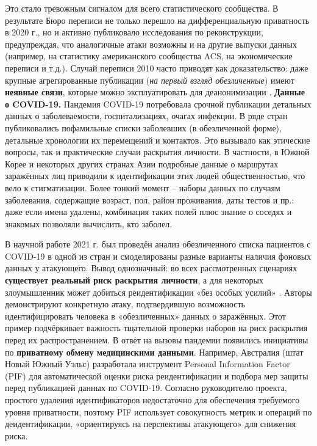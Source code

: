 Это стало тревожным сигналом для
всего статистического сообщества. В результате Бюро переписи не только перешло на дифференциальную приватность в 2020
г., но и активно публиковало исследования по реконструкции, предупреждая, что аналогичные атаки возможны и на другие
выпуски данных (например, на статистику американского сообщества ACS, на экономические переписи и т.д.). Случай переписи
2010 часто приводят как доказательство: даже крупные агрегированные публикации (\textit{на первый взгляд обезличенные})
имеют \textbf{неявные связи}, которые можно эксплуатировать для деанонимизации \autocite{cornell-edu}. \textbf{Данные о
COVID-19.} Пандемия COVID-19 потребовала срочной публикации детальных данных о заболеваемости, госпитализациях, очагах
инфекции. В ряде стран публиковались пофамильные списки заболевших (в обезличенной форме), детальные хронологии их
перемещений и контактов. Это вызывало как этические вопросы, так и практические случаи раскрытия личности. В частности,
в Южной Корее и некоторых других странах Азии подробные данные о маршрутах заражённых лиц приводили к идентификации этих
людей общественностью, что вело к стигматизации. Более тонкий момент – наборы данных по случаям заболевания, содержащие
возраст, пол, район проживания, даты тестов и пр.: даже если имена удалены, комбинация таких полей плюс знание о соседях
и знакомых позволяли вычислить, кто заболел.

В научной работе 2021 г. был проведён анализ обезличенного списка пациентов
с COVID-19 в одной из стран и смоделированы разные варианты наличия фоновых данных у атакующего. Вывод однозначный: во
всех рассмотренных сценариях \textbf{существует реальный риск раскрытия личности}, а для некоторых злоумышленник может
добиться реидентификации «без особых усилий» \autocite{journals-plos-org}. Авторы демонстрируют конкретную атаку,
подтвердившую возможность идентифицировать человека в «обезличенных» данных о заражённых. Этот пример подчёркивает
важность тщательной проверки наборов на риск раскрытия перед их распространением. В ответ на вызовы пандемии появились
инициативы по \textbf{приватному обмену медицинскими данными}. Например, Австралия (штат Новый Южный Уэльс) разработала
инструмент Personal Information Factor (PIF) для автоматической оценки риска реидентификации и подбора мер защиты перед
публикацией данных по COVID-19. Согласно руководителю проекта, простого удаления идентификаторов недостаточно для
обеспечения требуемого уровня приватности, поэтому PIF использует совокупность метрик и операций по деидентификации,
«ориентируясь на перспективы атакующего» для снижения риска.

